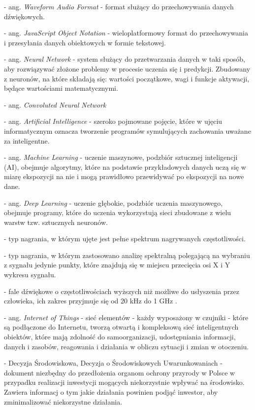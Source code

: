 \documentclass{sprz}
\begin{document}
\begin{description}[align=left]
  \item [WAV] - ang. \textit{Waveform Audio Format} - format służący do przechowywania danych dźwiękowych.
  \item [JSON] - ang. \textit{JavaScript Object Notation} - wieloplatformowy format do przechowywania i przesyłania danych obiektowych w formie tekstowej.
  \item [NN] - ang. \textit{Neural Network} - system służący do przetwarzania danych w taki sposób, aby rozwiązywać złożone problemy w procesie uczenia się i predykcji. Zbudowany z neuronów, na które składają się: wartości początkowe, wagi i funkcje aktywacji, będące wartościami matematycznymi.
  \item [CNN] - ang. \textit{Convoluted Neural Network}
  \item [AI] - ang. \textit{Artificial Intelligence} - szeroko pojmowane pojęcie, które w ujęciu informatycznym oznacza tworzenie programów symulujących zachowania uważane za inteligentne.
  \item [ML] - ang. \textit{Machine Learning} - uczenie maszynowe, podzbiór sztucznej inteligencji (AI), obejmuje algorytmy, które na podstawie przykładowych danych uczą się w miarę ekspozycji na nie i mogą prawidłowo przewidywać po ekspozycji na nowe dane.
  \item [DL] - ang. \textit{Deep Learning} - uczenie głębokie, podzbiór uczenia maszynowego, obejmuje programy, które do uczenia wykorzystują sieci zbudowane z wielu warstw tzw. sztucznych neuronów.
  \item [Nagranie typu full-spectrum] - typ nagrania, w którym ujęte jest pełne spektrum nagrywanych częstotliwości.
  \item [Nagranie typu zero-crossing] - typ nagrania, w którym zastosowano analizę spektralną polegającą na wybraniu z sygnału jedynie punkty, które znajdują się w miejscu przecięcia osi X i Y wykresu sygnału.
  \item [Ultradźwięki] - fale dźwiękowe o częstotliwościach wyższych niż możliwe do usłyszenia przez człowieka, ich zakres przyjmuje się od 20 kHz do 1 GHz \cite{ultradzwieki}.
  \item [IoT] - ang. \textit{Internet of Things} - sieć elementów - każdy wyposażony w czujniki - które są podłączone do Internetu, tworzą otwartą i kompleksową sieć inteligentnych obiektów, które mają zdolność do samoorganizacji, udostępniania informacji, danych i zasobów, reagowania i działania w obliczu sytuacji i zmian w otoczeniu.
  \item [DŚ] - Decyzja Środowiskowa, Decyzja o Środowiskowych Uwarunkowaniach - dokument niezbędny do przedłożenia organom ochrony przyrody w Polsce w przypadku realizacji inwestycji mogących niekorzystnie wpływać na środowisko. Zawiera informacj o tym jakie działania powinien podjąć inwestor, aby zminimalizować niekorzystne działania.

\end{description}
\end{document}

